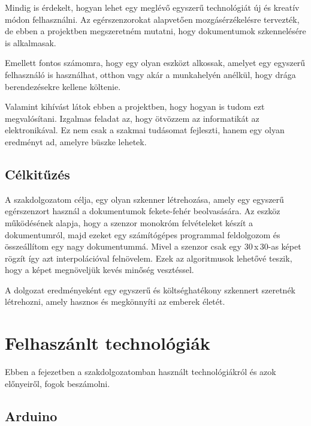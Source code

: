 \documentclass[]{thesis-ekf}
\theoremstyle{definition}
\theoremstyle{remark}
\begin{document}
Mindig is érdekelt, hogyan lehet egy meglévő egyszerű technológiát új és kreatív módon felhasználni. Az egérszenzorokat alapvetően mozgásérzékelésre tervezték, de ebben a projektben megszeretném mutatni, hogy dokumentumok szkennelésére is alkalmasak.

Emellett fontos számomra, hogy egy olyan eszközt alkossak, amelyet egy egyszerű felhasználó is használhat, otthon vagy akár a munkahelyén anélkül, hogy drága berendezésekre kellene költenie. 

Valamint kihívást látok ebben a projektben, hogy hogyan is tudom ezt megvalósítani. Izgalmas feladat az, hogy ötvözzem az informatikát az elektronikával. Ez nem csak a szakmai tudásomat fejleszti, hanem egy olyan eredményt ad, amelyre büszke lehetek.
\section{Célkitűzés}
A szakdolgozatom célja, egy olyan szkenner létrehozása, amely egy egyszerű egérszenzort használ a dokumentumok fekete-fehér beolvasására. Az eszköz működésének alapja, hogy a szenzor monokróm felvételeket készít a dokumentumról, majd ezeket egy számítógépes programmal feldolgozom és összeállítom egy nagy dokumentummá. Mivel a szenzor csak egy 30\,x\,30-as képet rögzít így azt interpolációval felnövelem. Ezek az algoritmusok lehetővé teszik, hogy a képet megnöveljük kevés minőség vesztéssel. 

A dolgozat eredményeként egy egyszerű és költséghatékony szkennert szeretnék létrehozni, amely hasznos és megkönnyíti az emberek életét.
\chapter{Felhaszánlt technológiák}
Ebben a fejezetben a szakdolgozatomban használt technológiákról és azok előnyeiről, fogok beszámolni.
\section{Arduino}
\end{document}
